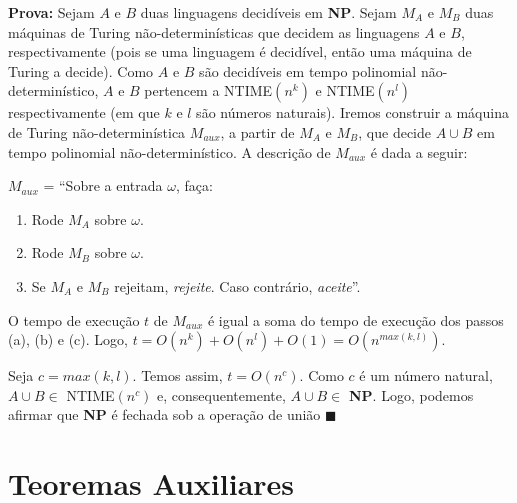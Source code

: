 \documentclass[12pt,a4paper,oneside]{article}
\begin{document}
\begin{enumerate}
	{\color{blue}
		{\bf Prova:} Sejam $A$ e $B$ duas linguagens decidíveis em {\bf NP}. Sejam $M_A$ e $M_B$ duas máquinas de Turing não-determinísticas que decidem as linguagens $A$ e $B$, respectivamente (pois se uma linguagem é decidível, então uma máquina de Turing a decide). Como $A$ e $B$ são decidíveis em tempo polinomial não-determinístico, $A$ e $B$ pertencem a {\sc NTIME}$(n^k)$ e {\sc NTIME}$(n^l)$ respectivamente (em que $k$ e $l$ são números naturais).  Iremos construir a máquina de Turing não-determinística $M_{aux}$, a partir de $M_A$ e $M_B$, que decide $A \cup B$ em tempo polinomial não-determinístico. A descrição de $M_{aux}$ é dada a seguir:
		
		$M_{aux}$ = ``Sobre a entrada $\omega$, faça:
		\begin{enumerate}
			\item Rode $M_A$ sobre $\omega$.
			\item Rode $M_B$ sobre $\omega$. 
			\item Se $M_A$ e $M_B$ rejeitam, {\it rejeite}. Caso contrário, {\it aceite}''.
		\end{enumerate}
		
		O tempo de execução $t$ de $M_{aux}$ é igual a soma do tempo de execução dos passos (a), (b) e (c). Logo, $t = O(n^k) + O(n^l) + O(1) = O(n^{max(k,l)})$. 
		
		Seja  $c = max(k,l)$. Temos assim, $t = O(n^c)$. Como $c$ é um número natural, $A \cup B \in$ {\sc NTIME}$(n^c)$ e, consequentemente, $A \cup B \in$ {\bf NP}. Logo, podemos afirmar que {\bf NP} é fechada sob a operação de união $\blacksquare$
	}
	
\end{enumerate}

\newpage

\section*{Teoremas Auxiliares}
\end{document}
